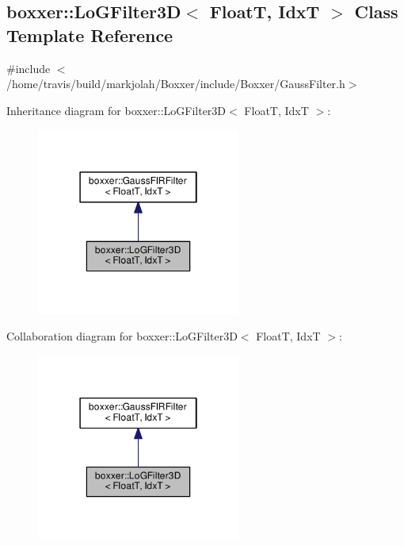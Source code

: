 \hypertarget{classboxxer_1_1LoGFilter3D}{}\subsection{boxxer\+:\+:Lo\+G\+Filter3D$<$ FloatT, IdxT $>$ Class Template Reference}
\label{classboxxer_1_1LoGFilter3D}


{\ttfamily \#include $<$/home/travis/build/markjolah/\+Boxxer/include/\+Boxxer/\+Gauss\+Filter.\+h$>$}



Inheritance diagram for boxxer\+:\+:Lo\+G\+Filter3D$<$ FloatT, IdxT $>$\+:\nopagebreak
\begin{figure}[H]
\begin{center}
\leavevmode
\includegraphics[width=190pt]{classboxxer_1_1LoGFilter3D__inherit__graph}
\end{center}
\end{figure}


Collaboration diagram for boxxer\+:\+:Lo\+G\+Filter3D$<$ FloatT, IdxT $>$\+:\nopagebreak
\begin{figure}[H]
\begin{center}
\leavevmode
\includegraphics[width=190pt]{classboxxer_1_1LoGFilter3D__coll__graph}
\end{center}
\end{figure}
